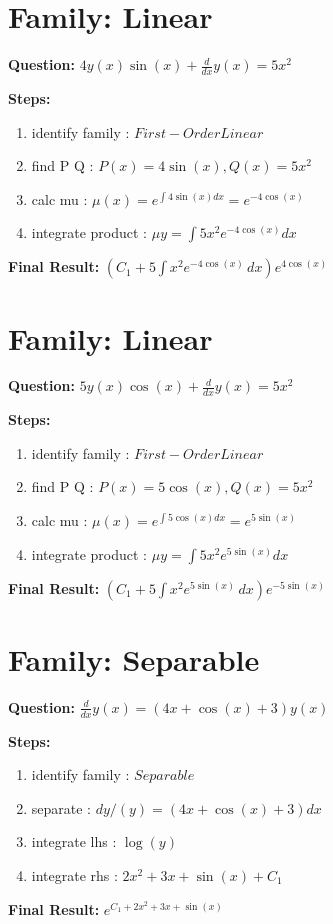 \documentclass{article}
\begin{document}
\section*{Family: Linear}
\textbf{Question:} $4 y{\left(x \right)} \sin{\left(x \right)} + \frac{d}{d x} y{\left(x \right)} = 5 x^{2}$

\textbf{Steps:}
\begin{enumerate}
\item identify family :  $First-Order Linear$
\item find P Q :  $P(x)=4 \sin{\left(x \right)}, Q(x)=5 x^{2}$
\item calc mu :  $\mu(x) = e^{\int 4 \sin{\left(x \right)} dx} = e^{- 4 \cos{\left(x \right)}}$
\item integrate product :  $\mu y = \int 5 x^{2} e^{- 4 \cos{\left(x \right)}} dx$
\end{enumerate}
\textbf{Final Result:} $\left(C_{1} + 5 \int x^{2} e^{- 4 \cos{\left(x \right)}}\, dx\right) e^{4 \cos{\left(x \right)}}$

\section*{Family: Linear}
\textbf{Question:} $5 y{\left(x \right)} \cos{\left(x \right)} + \frac{d}{d x} y{\left(x \right)} = 5 x^{2}$

\textbf{Steps:}
\begin{enumerate}
\item identify family :  $First-Order Linear$
\item find P Q :  $P(x)=5 \cos{\left(x \right)}, Q(x)=5 x^{2}$
\item calc mu :  $\mu(x) = e^{\int 5 \cos{\left(x \right)} dx} = e^{5 \sin{\left(x \right)}}$
\item integrate product :  $\mu y = \int 5 x^{2} e^{5 \sin{\left(x \right)}} dx$
\end{enumerate}
\textbf{Final Result:} $\left(C_{1} + 5 \int x^{2} e^{5 \sin{\left(x \right)}}\, dx\right) e^{- 5 \sin{\left(x \right)}}$

\section*{Family: Separable}
\textbf{Question:} $\frac{d}{d x} y{\left(x \right)} = \left(4 x + \cos{\left(x \right)} + 3\right) y{\left(x \right)}$

\textbf{Steps:}
\begin{enumerate}
\item identify family :  $Separable$
\item separate :  $dy / (y) = (4 x + \cos{\left(x \right)} + 3) dx$
\item integrate lhs :  $\log{\left(y \right)}$
\item integrate rhs :  $2 x^{2} + 3 x + \sin{\left(x \right)} + C_1$
\end{enumerate}
\textbf{Final Result:} $e^{C_{1} + 2 x^{2} + 3 x + \sin{\left(x \right)}}$
\end{document}
